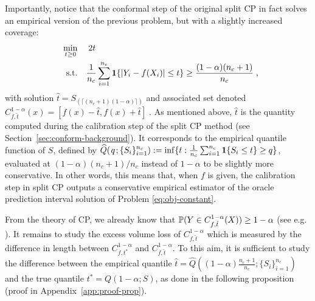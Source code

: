 Importantly, notice that the conformal step of the original split CP in fact solves an empirical version of the previous problem, but with a slightly increased coverage: %
%
\begin{align}
    \min_{t \geq 0} \quad &\; 2t \label{eq:obj-constant-emp} \\
     \quad \text{s.t.} \quad & \frac{1}{n_c}\sum_{i=1}^{n_c}\mathbf{1}\{|Y_i-f(X_i)|\leq t\} \geq \frac{(1-\alpha)(n_c+1)}{n_c}\; , \nonumber
\end{align}
%
with solution $\hat{t} = S_{(\lceil (n_c+1)(1-\alpha) \rceil)}$ and associated set denoted %
$C^{1-\alpha}_{f,\hat{t}}(x) = [f(x) - \hat{t}, f(x) + \hat{t}] \; .$
%
As mentioned above, $\hat{t}$ is the quantity computed during the calibration step of the split CP method (see Section~\ref{sec:conform-background}). It corresponds to the empirical quantile function of $S$, defined by $\widehat{Q}(\hspace{.1em} q \hspace{.1em};\{S_i\}_{i=1}^{n_c}):= \inf\{t : \frac{1}{n_c}\sum_{i=1}^{n_c}\mathbf{1}\{S_i\leq t\}\geq q\}$, evaluated at $(1-\alpha)(n_c+1)/n_c$ instead of $1-\alpha$ to be slightly more conservative. In other words, this means that, when $f$ is given, the calibration step in split CP outputs a conservative empirical estimator of the oracle prediction interval solution of Problem \eqref{eq:obj-constant}.

From the theory of CP, we already know that ${\mathbb{P}}(Y\in C^{1-\alpha}_{f,\hat{t}}(X))\geq 1-\alpha$ (see e.g. \citet[Theorem 2.2]{lei2018distribution}). It remains to study the excess volume loss of $C^{1-\alpha}_{f,\hat{t}}$ which is measured by the difference in length between $C^{1-\alpha}_{f,t^*}$ and $C^{1-\alpha}_{f,\hat{t}}$. To this aim, it is sufficient to study the difference between the empirical quantile $\hat{t} = \widehat{Q}((1-\alpha)\frac{n_c+1}{n_c};\{S_i\}_{i=1}^{n_c})$ and the true quantile $t^* = Q(1-\alpha; S)$,  %
as done in the following proposition (proof in Appendix~\ref{app:proof-prop}).\\

